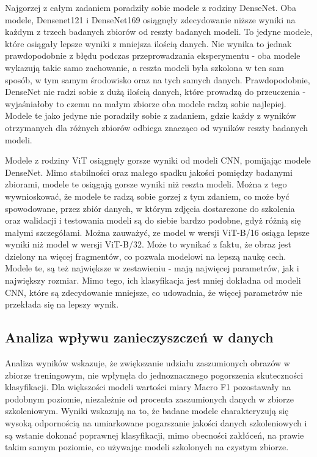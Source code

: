 Najgorzej z całym zadaniem poradziły sobie modele z rodziny DenseNet. Oba modele, Densenet121 i DenseNet169 osiągnęły zdecydowanie niższe wyniki na każdym z trzech badanych zbiorów od reszty badanych modeli. To jedyne modele, które osiągały lepsze wyniki z mniejsza ilością danych. Nie wynika to jednak prawdopodobnie z błędu podczas przeprowadzania eksperymentu - oba modele wykazują takie samo zachowanie, a reszta modeli była szkolona w ten sam sposób, w tym samym środowisko oraz na tych samych danych. Prawdopodobnie, DenseNet nie radzi sobie z dużą ilością danych, które prowadzą do przeuczenia - wyjaśniałoby to czemu na małym zbiorze oba modele radzą sobie najlepiej. Modele te jako jedyne nie poradziły sobie z zadaniem, gdzie każdy z wyników otrzymanych dla różnych zbiorów odbiega znacząco od wyników reszty badanych modeli.  

Modele z rodziny ViT osiągnęły gorsze wyniki od modeli CNN, pomijając modele DenseNet. Mimo stabilności oraz małego spadku jakości pomiędzy badanymi zbiorami, modele te osiągają gorsze wyniki niż reszta modeli. Można z tego wywnioskować, że modele te radzą sobie gorzej z tym zdaniem, co może być spowodowane, przez zbiór danych, w którym zdjęcia dostarczone do szkolenia oraz walidacji i testowania modeli są do siebie bardzo podobne, gdyż różnią się małymi szczegółami. Można zauważyć, ze model w wersji ViT-B/16 osiąga lepsze wyniki niż model w wersji ViT-B/32. Może to wynikać z faktu, że obraz jest dzielony na więcej fragmentów, co pozwala modelowi na lepszą naukę cech. Modele te, są też największe w zestawieniu - mają najwięcej parametrów, jak i największy rozmiar. Mimo tego, ich klasyfikacja jest mniej dokładna od modeli CNN, które są zdecydowanie mniejsze, co udowadnia, że więcej parametrów nie przekłada się na lepszy wynik.



  
\subsection{Analiza wpływu zanieczyszczeń w danych}
Analiza wyników wskazuje, że zwiększanie udziału zaszumionych obrazów w zbiorze treningowym, nie wpłynęła do jednoznacznego pogorszenia skuteczności klasyfikacji. Dla większości modeli wartości miary Macro F1 pozostawały na podobnym poziomie, niezależnie od procenta zaszumionych danych w zbiorze szkoleniowym. Wyniki wskazują na to, że badane modele  charakteryzują się wysoką odpornością na umiarkowane pogarszanie jakości danych szkoleniowych i są wstanie dokonać poprawnej klasyfikacji, mimo obecności zakłóceń, na prawie takim samym poziomie, co używając modeli szkolonych na czystym zbiorze.

